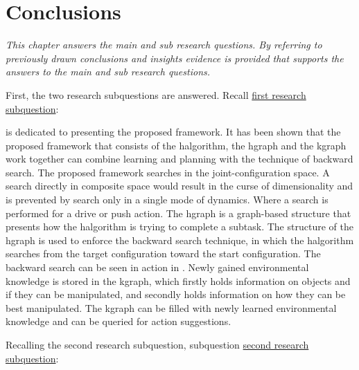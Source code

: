 \chapter{Conclusions}%
\label{chap:conclusion}
\textit{This chapter answers the main and sub research questions. By referring to previously drawn conclusions and insights evidence is provided that supports the answers to the main and sub research questions.\bs}

First, the two research subquestions are answered. Recall \hyperref[researchsubquestion:does_it_work]{first research subquestion}:\vspace{0.5\baselineskip}\\
\textit{\vspace{0.5\baselineskip}}\bs

 is dedicated to presenting the proposed framework. It has been shown that the proposed framework that consists of the \ac{halgorithm}, the \ac{hgraph} and the \ac{kgraph} work together can combine learning and planning with the technique of backward search. The proposed framework searches in the joint-configuration space. A search directly in composite space would result in the curse of dimensionality and is prevented by search only in a single mode of dynamics. Where a search is performed for a drive or push action. The \ac{hgraph} is a graph-based structure that presents how the \ac{halgorithm} is trying to complete a subtask. The structure of the \ac{hgraph} is used to enforce the backward search technique, in which the \ac{halgorithm} searches from the target configuration toward the start configuration. The backward search can be seen in action in . Newly gained environmental knowledge is stored in the \ac{kgraph}, which firstly holds information on objects and if they can be manipulated, and secondly holds information on how they can be best manipulated. The \ac{kgraph} can be filled with newly learned environmental knowledge and can be queried for action suggestions.\bs

Recalling the second research subquestion, subquestion \hyperref[researchsubquestion:does_it_compare]{second research subquestion}:\vspace{0.5\baselineskip}\\
\textit{}\vspace{0.5\baselineskip}\bs



